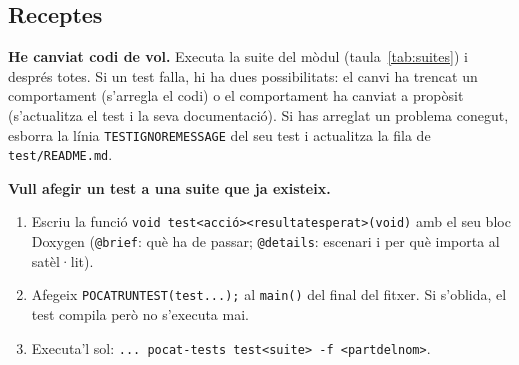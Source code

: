 \documentclass[11pt,a4paper]{article}
\DeclareRobustCommand{\_}{\textunderscore\allowbreak}
\newcommand{\cd}[1]{\texttt{#1}}
\begin{document}
\subsection{Receptes}

\textbf{He canviat codi de vol.} Executa la suite del mòdul (taula~\ref{tab:suites}) i
després totes. Si un test falla, hi ha dues possibilitats: el canvi ha trencat un
comportament (s'arregla el codi) o el comportament ha canviat a propòsit (s'actualitza el
test i la seva documentació). Si has arreglat un problema conegut, esborra la línia
\cd{TEST\_IGNORE\_MESSAGE} del seu test i actualitza la fila de \cd{test/README.md}.

\textbf{Vull afegir un test a una suite que ja existeix.}
\begin{enumerate}
\item Escriu la funció \cd{void test\_<acció>\_<resultat\_esperat>(void)} amb el seu bloc
  Doxygen (\cd{@brief}: què ha de passar; \cd{@details}: escenari i per què importa al satèl·lit).
\item Afegeix \cd{POCAT\_RUN\_TEST(test\_...);} al \cd{main()} del final del fitxer. Si
  s'oblida, el test compila però no s'executa mai.
\item Executa'l sol: \cd{... pocat-tests test\_<suite> -f <part\_del\_nom>}.
\end{enumerate}
\end{document}
